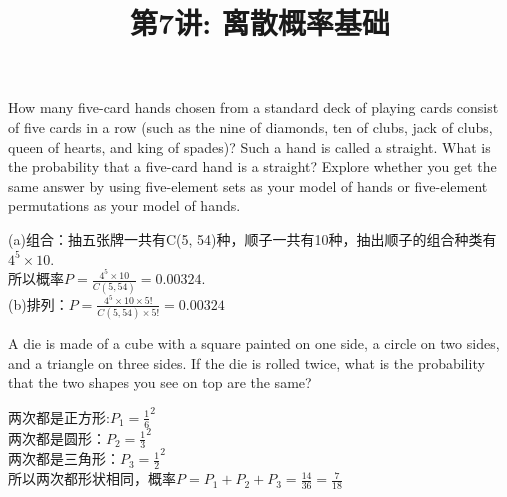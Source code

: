 \documentclass[a4paper, justified]{tufte-handout}
\title{第7讲: 离散概率基础}
\date{\zhtoday} %
\begin{document}
\maketitle
\noplagiarism %
\begin{abstract}
\end{abstract}
\beginrequired

\begin{problem}[CS 5.1-10]
How many five-card hands chosen from a standard deck of playing cards consist of five cards in a row (such as the nine of diamonds, ten of clubs, jack of clubs, queen of hearts, and king of spades)? Such a hand is called a straight. What is the probability that a five-card hand is a straight? Explore whether you get the same answer by using five-element sets as your model of hands or five-element permutations as your model of hands.
\end{problem}

\begin{solution}
  (a)组合：抽五张牌一共有C(5, 54)种，顺子一共有10种，抽出顺子的组合种类有$4^5 \times 10$.\\
  所以概率$P = \frac{4^5 \times 10}{C(5, 54)} = 0.00324$.\\
  (b)排列：$P= \frac{4^5 \times 10 \times 5!}{C(5, 54)\times 5!} = 0.00324$
\end{solution}

\begin{problem}[CS 5.1-12]
A die is made of a cube with a square painted on one side, a circle on two sides, and a triangle on three sides. If the die is rolled twice, what is the probability that the two shapes you see on top are the same?
\end{problem}

\begin{solution}
  两次都是正方形:$P_1 = \frac{1}{6} ^ 2$\\
  两次都是圆形：$P_2 = \frac{1}{3} ^2$\\
  两次都是三角形：$P_3 = \frac{1}{2} ^ 2$\\
  所以两次都形状相同，概率$P = P_1 + P_2 + P_3 = \frac{14}{36} = \frac{7}{18}$
\end{solution}
\end{document}

